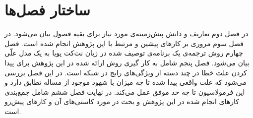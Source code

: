 \section{ساختار فصل‌ها}
در فصل دوم تعاریف و دانش پیش‌زمینه‌ی مورد نیاز برای بقیه فصول 
بیان می‌شود.
 در فصل سوم مروری بر کار‌های پیشین و مرتبط با این پژوهش انجام شده است.
فصل چهارم روش ترجمه‌ی یک برنامه‌ی توصیف شده در زبان نت‌کت پویا به یک مدل علّی
بیان می‌شود.
فصل پنجم شامل به کار گیری روش ارائه شده در این پژوهش برای پیدا کردن علت خطا در چند دسته از ویژگی‌های رایج در شبکه است. در این فصل بررسی می‌شود که علت واقعی پیدا شده تا چه میزان با شهود موجود از مساله تطابق دارد و این فرمولاسیون تا چه حد موفق عمل می‌کند.
در نهایت فصل ششم شامل جمع‌بندی کار‌های انجام شده در این پژوهش و بحث در مورد کاستی‌های آن و کار‌های پیش‌رو است.
